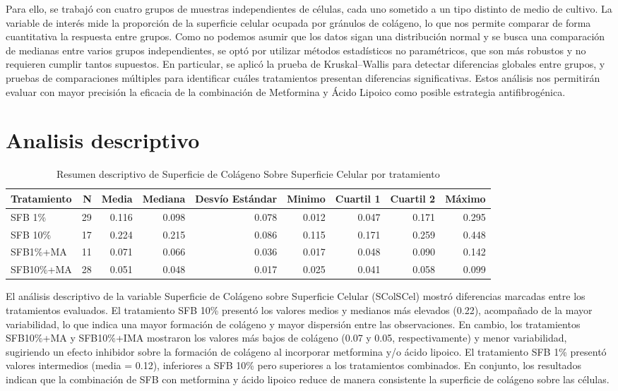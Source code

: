 \documentclass[
  10pt,
]{article}
\begin{document}
Para ello, se trabajó con cuatro grupos de muestras independientes de
células, cada uno sometido a un tipo distinto de medio de cultivo. La
variable de interés mide la proporción de la superficie celular ocupada
por gránulos de colágeno, lo que nos permite comparar de forma
cuantitativa la respuesta entre grupos. Como no podemos asumir que los
datos sigan una distribución normal y se busca una comparación de
medianas entre varios grupos independientes, se optó por utilizar
métodos estadísticos no paramétricos, que son más robustos y no
requieren cumplir tantos supuestos. En particular, se aplicó la prueba
de Kruskal--Wallis para detectar diferencias globales entre grupos, y
pruebas de comparaciones múltiples para identificar cuáles tratamientos
presentan diferencias significativas. Estos análisis nos permitirán
evaluar con mayor precisión la eficacia de la combinación de Metformina
y Ácido Lipoico como posible estrategia antifibrogénica.

\section{Analisis descriptivo}\label{analisis-descriptivo}

\begin{longtable}[t]{lrrrrrrrr}
\caption{\label{tab:unnamed-chunk-3}Resumen descriptivo de Superficie de Colágeno Sobre Superficie Celular por tratamiento}\\
\toprule
Tratamiento & N & Media & Mediana & Desvío Estándar & Minimo & Cuartil 1 & Cuartil 2 & Máximo\\
\midrule
SFB 1\% & 29 & 0.116 & 0.098 & 0.078 & 0.012 & 0.047 & 0.171 & 0.295\\
SFB 10\% & 17 & 0.224 & 0.215 & 0.086 & 0.115 & 0.171 & 0.259 & 0.448\\
SFB1\%+MA & 11 & 0.071 & 0.066 & 0.036 & 0.017 & 0.048 & 0.090 & 0.142\\
SFB10\%+MA & 28 & 0.051 & 0.048 & 0.017 & 0.025 & 0.041 & 0.058 & 0.099\\
\bottomrule
\end{longtable}

El análisis descriptivo de la variable Superficie de Colágeno sobre
Superficie Celular (SColSCel) mostró diferencias marcadas entre los
tratamientos evaluados. El tratamiento SFB 10\% presentó los valores
medios y medianos más elevados (0.22), acompañado de la mayor
variabilidad, lo que indica una mayor formación de colágeno y mayor
dispersión entre las observaciones. En cambio, los tratamientos
SFB10\%+MA y SFB10\%+IMA mostraron los valores más bajos de colágeno
(0.07 y 0.05, respectivamente) y menor variabilidad, sugiriendo un
efecto inhibidor sobre la formación de colágeno al incorporar metformina
y/o ácido lipoico. El tratamiento SFB 1\% presentó valores intermedios
(media = 0.12), inferiores a SFB 10\% pero superiores a los tratamientos
combinados. En conjunto, los resultados indican que la combinación de
SFB con metformina y ácido lipoico reduce de manera consistente la
superficie de colágeno sobre las células.
\end{document}
